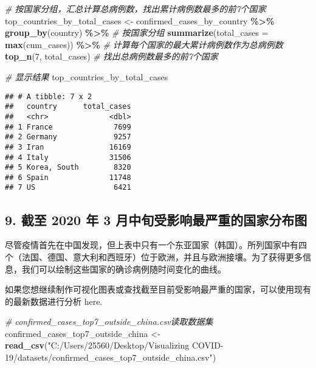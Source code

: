 \documentclass[
]{article}
\newenvironment{Shaded}{\begin{snugshade}}{\end{snugshade}}
\newcommand{\AttributeTok}[1]{\textcolor[rgb]{0.13,0.29,0.53}{#1}}
\newcommand{\CommentTok}[1]{\textcolor[rgb]{0.56,0.35,0.01}{\textit{#1}}}
\newcommand{\DecValTok}[1]{\textcolor[rgb]{0.00,0.00,0.81}{#1}}
\newcommand{\FunctionTok}[1]{\textcolor[rgb]{0.13,0.29,0.53}{\textbf{#1}}}
\newcommand{\NormalTok}[1]{#1}
\newcommand{\OtherTok}[1]{\textcolor[rgb]{0.56,0.35,0.01}{#1}}
\newcommand{\SpecialCharTok}[1]{\textcolor[rgb]{0.81,0.36,0.00}{\textbf{#1}}}
\newcommand{\StringTok}[1]{\textcolor[rgb]{0.31,0.60,0.02}{#1}}
\begin{document}
\begin{Shaded}
\begin{Highlighting}[]
\CommentTok{\# 按国家分组，汇总计算总病例数，找出累计病例数最多的前7个国家}
\NormalTok{top\_countries\_by\_total\_cases }\OtherTok{\textless{}{-}}\NormalTok{ confirmed\_cases\_by\_country }\SpecialCharTok{\%\textgreater{}\%}
  \FunctionTok{group\_by}\NormalTok{(country) }\SpecialCharTok{\%\textgreater{}\%}  \CommentTok{\# 按国家分组}
  \FunctionTok{summarize}\NormalTok{(}\AttributeTok{total\_cases =} \FunctionTok{max}\NormalTok{(cum\_cases)) }\SpecialCharTok{\%\textgreater{}\%}  \CommentTok{\# 计算每个国家的最大累计病例数作为总病例数}
  \FunctionTok{top\_n}\NormalTok{(}\DecValTok{7}\NormalTok{, total\_cases)  }\CommentTok{\# 找出总病例数最多的前7个国家}

\CommentTok{\# 显示结果}
\NormalTok{top\_countries\_by\_total\_cases}
\end{Highlighting}
\end{Shaded}

\begin{verbatim}
## # A tibble: 7 x 2
##   country      total_cases
##   <chr>              <dbl>
## 1 France              7699
## 2 Germany             9257
## 3 Iran               16169
## 4 Italy              31506
## 5 Korea, South        8320
## 6 Spain              11748
## 7 US                  6421
\end{verbatim}

\subsection{9. 截至 2020 年 3
月中旬受影响最严重的国家分布图}\label{ux622aux81f3-2020-ux5e74-3-ux6708ux4e2dux65ecux53d7ux5f71ux54cdux6700ux4e25ux91cdux7684ux56fdux5bb6ux5206ux5e03ux56fe}

尽管疫情首先在中国发现，但上表中只有一个东亚国家（韩国）。所列国家中有四个（法国、德国、意大利和西班牙）位于欧洲，并且与欧洲接壤。为了获得更多信息，我们可以绘制这些国家的确诊病例随时间变化的曲线。

如果您想继续制作可视化图表或查找截至目前受影响最严重的国家，可以使用现有的最新数据进行分析
here.

\begin{Shaded}
\begin{Highlighting}[]
\CommentTok{\# confirmed\_cases\_top7\_outside\_china.csv读取数据集}
\NormalTok{confirmed\_cases\_top7\_outside\_china }\OtherTok{\textless{}{-}} \FunctionTok{read\_csv}\NormalTok{(}\StringTok{"C:/Users/25560/Desktop/Visualizing COVID{-}19/datasets/confirmed\_cases\_top7\_outside\_china.csv"}\NormalTok{)}
\end{Highlighting}
\end{Shaded}
\end{document}

